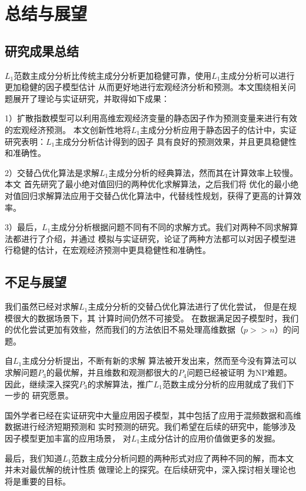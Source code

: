 \section{总结与展望}


\subsection{研究成果总结}
$L_1$范数主成分分析比传统主成分分析更加稳健可靠，使用$L_1$主成分分析可以进行更加稳健的因子模型估计
从而更好地进行宏观经济分析和预测。本文围绕相关问题展开了理论与实证研究，并取得如下成果：

1）扩散指数模型可以利用高维宏观经济变量的静态因子作为预测变量来进行有效的宏观经济预测。
本文创新性地将$L_1$主成分分析应用于静态因子的估计中，实证研究表明：$L_1$主成分分析估计得到的因子
具有良好的预测效果，并且更具稳健性和准确性。

2）交替凸优化算法是求解$L_1$主成分分析的经典算法，然而其在计算效率上较慢。本文
首先研究了最小绝对值回归的两种优化求解算法，之后我们将
优化的最小绝对值回归求解算法应用于交替凸优化算法中，代替线性规划，获得了更高的计算效率。

3）最后，$L_1$主成分分析根据问题不同有不同的求解方式。我们对两种不同求解算法都进行了介绍，并通过
模拟与实证研究，论证了两种方法都可以对因子模型进行稳健的估计，在宏观经济预测中更具稳健性和准确性。

\subsection{不足与展望}
我们虽然已经对求解$L_1$主成分分析的交替凸优化算法进行了优化尝试，
但是在规模很大的数据场景下，其
计算时间仍然不可接受。
在数据满足因子模型时，我们的优化尝试更加有效些，然而我们的方法依旧不易处理高维数据（$p >> n$）的问题。

自$L_1$主成分分析提出，不断有新的求解
算法被开发出来，然而至今没有算法可以求解问题$P_3$的最优解，并且维数和观测都很大的$P_4$问题已经被证明
为NP难题。
因此，继续深入探究$P_3$的求解算法，推广$L_1$范数主成分分析的应用就成了我们下一步的
研究愿景。

国外学者已经在实证研究中大量应用因子模型，其中包括了应用于混频数据和高维数据进行经济短期预测和
实时预测的研究。我们希望在后续的研究中，能够涉及因子模型更加丰富的应用场景，
对$L_1$主成分估计的应用价值做更多的发掘。

最后，我们知道$L_1$范数主成分分析问题的两种形式对应了两种不同的解，而本文并未对最优解的统计性质
做理论上的探究。在后续研究中，深入探讨相关理论也将是重要的目标。

